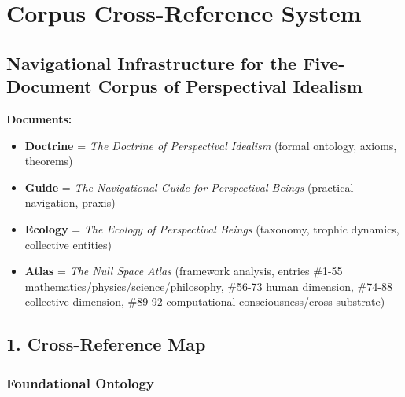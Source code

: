 \chapter*{Corpus Cross-Reference System}


\section*{Navigational Infrastructure for the Five-Document Corpus of Perspectival Idealism}


\textbf{Documents:}

\begin{itemize}[nosep,leftmargin=*]
  \item \textbf{Doctrine} = \textit{The Doctrine of Perspectival Idealism} (formal ontology, axioms, theorems)
  \item \textbf{Guide} = \textit{The Navigational Guide for Perspectival Beings} (practical navigation, praxis)
  \item \textbf{Ecology} = \textit{The Ecology of Perspectival Beings} (taxonomy, trophic dynamics, collective entities)
  \item \textbf{Atlas} = \textit{The Null Space Atlas} (framework analysis, entries \#1-55 mathematics/physics/science/philosophy, \#56-73 human dimension, \#74-88 collective dimension, \#89-92 computational consciousness/cross-substrate)
\end{itemize}


\bigskip\noindent\makebox[\textwidth]{\color{rulegray}\rule{5cm}{0.3pt}}\bigskip


\section*{1. Cross-Reference Map}


\subsection*{Foundational Ontology}




